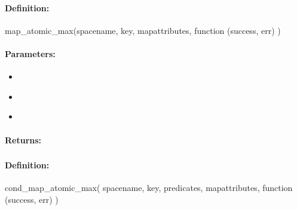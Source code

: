 \paragraph{Definition:}
\begin{javascriptcode}
map_atomic_max(spacename, key, mapattributes, function (success, err) {})
\end{javascriptcode}
\paragraph{Parameters:}
\begin{itemize}[noitemsep]
\item {}\\

\item {}\\

\item {}\\

\end{itemize}

\paragraph{Returns:}


\pagebreak
\subsubsection{}
\label{api:nodejs:cond_map_atomic_max}


\paragraph{Definition:}
\begin{javascriptcode}
cond_map_atomic_max(
        spacename, key, predicates, mapattributes, function (success, err) {})
\end{javascriptcode}
